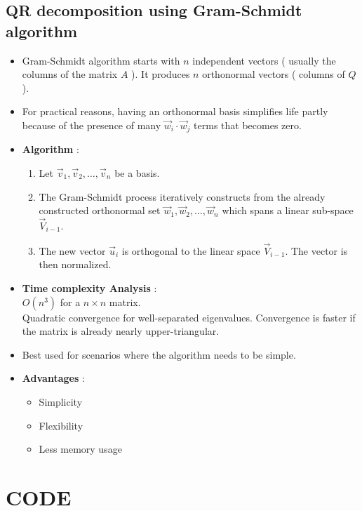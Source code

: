 \documentclass[article]{IEEEtran}
\numberwithin{equation}{enumi}
\numberwithin{figure}{enumi}
\begin{document}
			\subsection{QR decomposition using Gram-Schmidt algorithm}
			\begin{itemize}
				\item Gram-Schmidt algorithm starts with $n$ independent vectors ( usually the columns of the matrix $A$ ). It produces $n$ orthonormal vectors ( columns of $Q$ ).
				\item For practical reasons, having an orthonormal basis simplifies life partly because of the presence of many $\vec{w}_i \cdot \vec{w}_j$ terms that becomes zero.
				\item \textbf{Algorithm} :\\
					\begin{enumerate}
						\item Let $\vec{v}_1, \vec{v}_2, \dots, \vec{v}_n$ be a basis. 
						\item The Gram-Schmidt process iteratively constructs from the already constructed orthonormal set $\vec{w}_1, \vec{w}_2, \dots, \vec{w}_n$ which spans a linear sub-space $\vec{V}_{i-1}$. 
						\item The new vector $\vec{u}_i$ is orthogonal to the linear space $\vec{V}_{i-1}$. The vector is then normalized.
					\end{enumerate}
				\item \textbf{Time complexity Analysis} : \\
					$O(n^3)$ for a $n \times n$ matrix. \\
					Quadratic convergence for well-separated eigenvalues. Convergence is faster if the matrix is already nearly upper-triangular.
				\item Best used for scenarios where the algorithm needs to be simple.
				\item \textbf{Advantages} : \\
					\begin{itemize}
						\item Simplicity
						\item Flexibility
						\item Less memory usage
					\end{itemize}
                    \end{itemize}
\section*{\textbf{CODE}}
\end{document}
